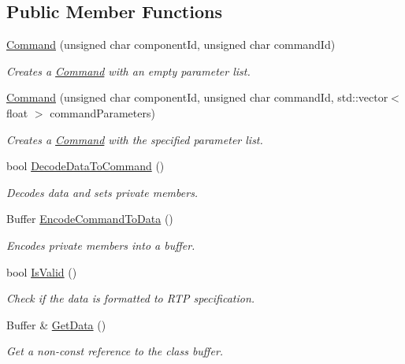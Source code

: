 \subsection*{Public Member Functions}
\begin{DoxyCompactItemize}
\item 
\hyperlink{classrbp_1_1Command_a1303846c9259f11544a315708ee7f995}{Command} (unsigned char component\+Id, unsigned char command\+Id)
\begin{DoxyCompactList}\small\item\em Creates a \hyperlink{classrbp_1_1Command}{Command} with an empty parameter list. \end{DoxyCompactList}\item 
\hyperlink{classrbp_1_1Command_a9e1d534af5ad4b89880f4e5185a537a6}{Command} (unsigned char component\+Id, unsigned char command\+Id, std\+::vector$<$ float $>$ command\+Parameters)
\begin{DoxyCompactList}\small\item\em Creates a \hyperlink{classrbp_1_1Command}{Command} with the specified parameter list. \end{DoxyCompactList}\item 
bool \hyperlink{classrbp_1_1Command_a5099ef6ecdb5aff8945e9faa216cebf6}{Decode\+Data\+To\+Command} ()
\begin{DoxyCompactList}\small\item\em Decodes data and sets private members. \end{DoxyCompactList}\item 
Buffer \hyperlink{classrbp_1_1Command_a44ecd677116909a1f8cbcbf139bebe7a}{Encode\+Command\+To\+Data} ()
\begin{DoxyCompactList}\small\item\em Encodes private members into a buffer. \end{DoxyCompactList}\item 
bool \hyperlink{classrbp_1_1Command_a163f68862717f9a1fe648dbc0ed793b2}{Is\+Valid} ()
\begin{DoxyCompactList}\small\item\em Check if the data is formatted to R\+T\+P specification. \end{DoxyCompactList}\item 
Buffer \& \hyperlink{classrbp_1_1Command_a653885df9002af1fdeb916dc567a931f}{Get\+Data} ()
\begin{DoxyCompactList}\small\item\em Get a non-\/const reference to the class buffer. \end{DoxyCompactList}\item 

\end{DoxyCompactItemize}
